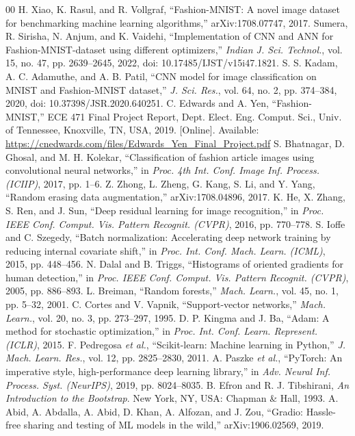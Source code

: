 \documentclass[conference]{IEEEtran}
\begin{document}
\begin{thebibliography}{00}
 H. Xiao, K. Rasul, and R. Vollgraf, ``Fashion-MNIST: A novel image dataset for benchmarking machine learning algorithms,'' arXiv:1708.07747, 2017.
 Sumera, R. Sirisha, N. Anjum, and K. Vaidehi, ``Implementation of CNN and ANN for Fashion-MNIST-dataset using different optimizers,'' \textit{Indian J. Sci. Technol.}, vol. 15, no. 47, pp. 2639--2645, 2022, doi: 10.17485/IJST/v15i47.1821.
 S. S. Kadam, A. C. Adamuthe, and A. B. Patil, ``CNN model for image classification on MNIST and Fashion-MNIST dataset,'' \textit{J. Sci. Res.}, vol. 64, no. 2, pp. 374--384, 2020, doi: 10.37398/JSR.2020.640251.
 C. Edwards and A. Yen, ``Fashion-MNIST,'' ECE 471 Final Project Report, Dept. Elect. Eng. Comput. Sci., Univ. of Tennessee, Knoxville, TN, USA, 2019. [Online]. Available: \url{https://cnedwards.com/files/Edwards_Yen_Final_Project.pdf}
 S. Bhatnagar, D. Ghosal, and M. H. Kolekar, ``Classification of fashion article images using convolutional neural networks,'' in \textit{Proc. 4th Int. Conf. Image Inf. Process. (ICIIP)}, 2017, pp. 1--6.
 Z. Zhong, L. Zheng, G. Kang, S. Li, and Y. Yang, ``Random erasing data augmentation,'' arXiv:1708.04896, 2017.
 K. He, X. Zhang, S. Ren, and J. Sun, ``Deep residual learning for image recognition,'' in \textit{Proc. IEEE Conf. Comput. Vis. Pattern Recognit. (CVPR)}, 2016, pp. 770--778.
 S. Ioffe and C. Szegedy, ``Batch normalization: Accelerating deep network training by reducing internal covariate shift,'' in \textit{Proc. Int. Conf. Mach. Learn. (ICML)}, 2015, pp. 448--456.
 N. Dalal and B. Triggs, ``Histograms of oriented gradients for human detection,'' in \textit{Proc. IEEE Conf. Comput. Vis. Pattern Recognit. (CVPR)}, 2005, pp. 886--893.
 L. Breiman, ``Random forests,'' \textit{Mach. Learn.}, vol. 45, no. 1, pp. 5--32, 2001.
 C. Cortes and V. Vapnik, ``Support-vector networks,'' \textit{Mach. Learn.}, vol. 20, no. 3, pp. 273--297, 1995.
 D. P. Kingma and J. Ba, ``Adam: A method for stochastic optimization,'' in \textit{Proc. Int. Conf. Learn. Represent. (ICLR)}, 2015.
 F. Pedregosa \textit{et al.}, ``Scikit-learn: Machine learning in Python,'' \textit{J. Mach. Learn. Res.}, vol. 12, pp. 2825--2830, 2011.
 A. Paszke \textit{et al.}, ``PyTorch: An imperative style, high-performance deep learning library,'' in \textit{Adv. Neural Inf. Process. Syst. (NeurIPS)}, 2019, pp. 8024--8035.
 B. Efron and R. J. Tibshirani, \textit{An Introduction to the Bootstrap}. New York, NY, USA: Chapman \& Hall, 1993.
 A. Abid, A. Abdalla, A. Abid, D. Khan, A. Alfozan, and J. Zou, ``Gradio: Hassle-free sharing and testing of ML models in the wild,'' arXiv:1906.02569, 2019.
\end{thebibliography}
\end{document}
